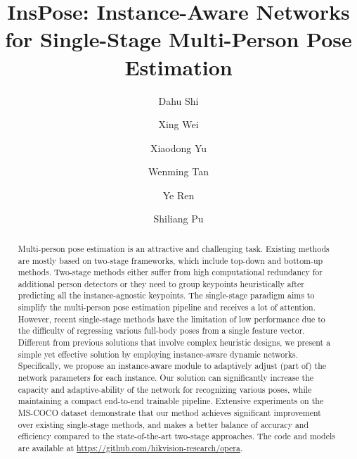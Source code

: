 \documentclass[sigconf]{acmart}
\begin{document}
\fancyhead{}

\title{InsPose: Instance-Aware Networks for Single-Stage Multi-Person Pose Estimation}



\author{Dahu Shi}

\author{Xing Wei}

\author{Xiaodong Yu}

\author{Wenming Tan}

\author{Ye Ren}

\author{Shiliang Pu}





\begin{abstract}
Multi-person pose estimation is an attractive and challenging task.
Existing methods are mostly based on two-stage frameworks, which include top-down and bottom-up methods.
Two-stage methods either suffer from high computational redundancy for additional person detectors or they need to group keypoints heuristically after predicting all the instance-agnostic keypoints.
The single-stage paradigm aims to simplify the multi-person pose estimation pipeline and receives a lot of attention.
However, recent single-stage methods have the limitation of low performance due to the difficulty of regressing various full-body poses from a single feature vector.
Different from previous solutions that involve complex heuristic designs, we present a simple yet effective solution by employing instance-aware dynamic networks.
Specifically, we propose an instance-aware module to adaptively adjust (part of) the network parameters for each instance.
Our solution can significantly increase the capacity and adaptive-ability of the network for recognizing various poses, while maintaining a compact end-to-end trainable pipeline.
Extensive experiments on the MS-COCO dataset demonstrate that our method achieves significant improvement over existing single-stage methods, and makes a better balance of accuracy and efficiency compared to the state-of-the-art two-stage approaches.
The code and models are available at \url{https://github.com/hikvision-research/opera}.
\end{abstract}
\end{document}
